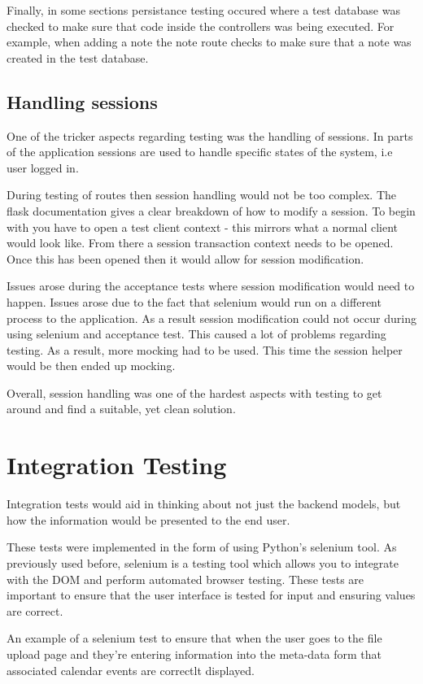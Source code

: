 Finally, in some sections persistance testing occured where a test database was checked to make sure that code inside the controllers was being executed. For example, when adding a note the note route checks to make sure that a note was created in the test database.

\subsection{Handling sessions}
One of the tricker aspects regarding testing was the handling of sessions. In parts of the application sessions are used to handle specific states of the system, i.e user logged in.

During testing of routes then session handling would not be too complex. The flask documentation gives a clear breakdown of how to modify a session. To begin with you have to open a test client context - this mirrors what a normal client would look like. From there a session transaction context needs to be opened. Once this has been opened then it would allow for session modification.

Issues arose during the acceptance tests where session modification would need to happen. Issues arose due to the fact that selenium would run on a different process to the application. As a result session modification could not occur during using selenium and acceptance test. This caused a lot of problems regarding testing. As a result, more mocking had to be used. This time the session helper would be then ended up mocking.

Overall, session handling was one of the hardest aspects with testing to get around and find a suitable, yet clean solution.

\section{Integration Testing}
Integration tests would aid in thinking about not just the backend models, but how the information would be presented to the end user.

These tests were implemented in the form of using Python's selenium tool. As previously used before, selenium is a testing tool which allows you to integrate with the DOM and perform automated browser testing. These tests are important to ensure that the user interface is tested for input and ensuring values are correct.

An example of a selenium test to ensure that when the user goes to the file upload page and they're entering information into the meta-data form that associated calendar events are correctlt displayed.

